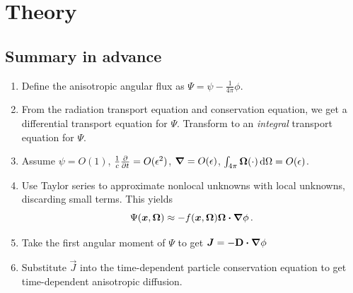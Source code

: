 \documentclass{beamer}
\begin{document}
\section{Theory}
\subsection{Summary in advance}
\begin{frame}
\begin{enumerate}
  \item Define the anisotropic angular flux as $\Psi = \psi -
    \frac{1}{4\pi}\phi$.
  \item From the radiation transport equation and conservation equation, we get
    a differential transport equation for $\Psi$.
    Transform to an \emph{integral} transport equation for $\Psi$.
  \item Assume $\psi=O(1)$, $\frac1c\frac{\partial }{\partial t}=O(\epsilon^2)$, $\bm{\nabla} =
    O(\epsilon)$, $\int_{4\pi} \bm{\Omega} (\cdot) \mathop{}\!\mathrm{d}\Omega = O(\epsilon)$.
  \item Use Taylor series to approximate nonlocal unknowns with local
    unknowns, discarding small terms. This yields
    \begin{equation*}
      \Psi(\bm{x}, \bm{\Omega})
      \approx - f(\bm{x}, \bm{\Omega})  \bm{\Omega} \bm{\cdot} \bm{\nabla} \phi\,.
    \end{equation*}
  \item Take the first angular moment of $\Psi$ to get
    $\bm{J}=-\mathbf{D} \bm{\cdot} \bm{\nabla} \phi$
  \item Substitute $\vec{J}$ into the time-dependent particle
    conservation equation to get time-dependent anisotropic diffusion.
\end{enumerate}
\end{frame}
\end{document}
